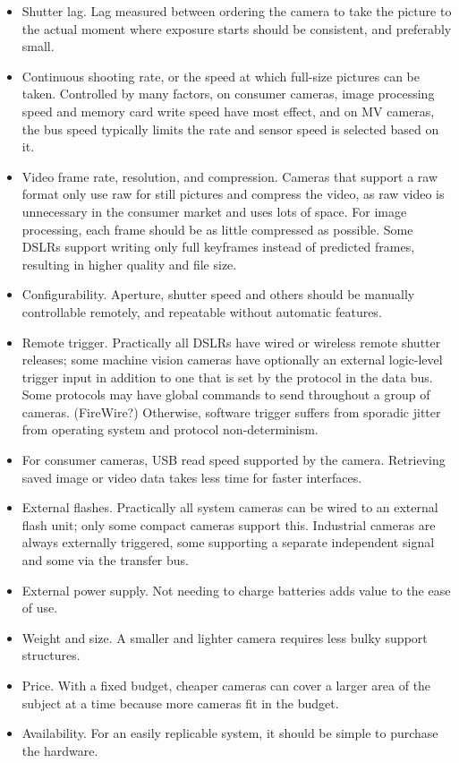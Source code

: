 \begin{itemize}
	\item Shutter lag. Lag measured between ordering the camera to take the picture to the actual moment where exposure starts should be consistent, and preferably small.

	\item Continuous shooting rate, or the speed at which full-size pictures can be taken. Controlled by many factors, on consumer cameras, image processing speed and memory card write speed have most effect, and on MV cameras, the bus speed typically limits the rate and sensor speed is selected based on it.

	\item Video frame rate, resolution, and compression. Cameras that support a raw format only use raw for still pictures and compress the video, as raw video is unnecessary in the consumer market and uses lots of space. For image processing, each frame should be as little compressed as possible. Some DSLRs support writing only full keyframes instead of predicted frames, resulting in higher quality and file size.

	\item Configurability. Aperture, shutter speed and others should be manually controllable remotely, and repeatable without automatic features.

	\item Remote trigger. Practically all DSLRs have wired or wireless remote shutter releases; some machine vision cameras have optionally an external logic-level trigger input in addition to one that is set by the protocol in the data bus. Some protocols may have global commands to send throughout a group of cameras. (FireWire?) Otherwise, software trigger suffers from sporadic jitter from operating system and protocol non-determinism.

	\item For consumer cameras, USB read speed supported by the camera. Retrieving saved image or video data takes less time for faster interfaces.

	\item External flashes. Practically all system cameras can be wired to an external flash unit; only some compact cameras support this. Industrial cameras are always externally triggered, some supporting a separate independent signal and some via the transfer bus.

	\item External power supply. Not needing to charge batteries adds value to the ease of use.

	\item Weight and size. A smaller and lighter camera requires less bulky support structures.

	\item Price. With a fixed budget, cheaper cameras can cover a larger area of the subject at a time because more cameras fit in the budget.

	\item Availability. For an easily replicable system, it should be simple to purchase the hardware.
\end{itemize}

